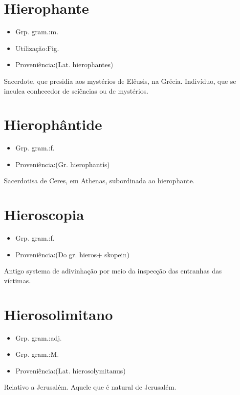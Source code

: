 \documentclass{article}
\begin{document}
\section{Hierophante}
\begin{itemize}
\item {Grp. gram.:m.}
\end{itemize}
\begin{itemize}
\item {Utilização:Fig.}
\end{itemize}
\begin{itemize}
\item {Proveniência:(Lat. \textunderscore hierophantes\textunderscore )}
\end{itemize}
Sacerdote, que presidia aos mystérios de Elêusis, na Grécia.
Indivíduo, que se inculca conhecedor de sciências ou de mystérios.
\section{Hierophântide}
\begin{itemize}
\item {Grp. gram.:f.}
\end{itemize}
\begin{itemize}
\item {Proveniência:(Gr. \textunderscore hierophantís\textunderscore )}
\end{itemize}
Sacerdotisa de Ceres, em Athenas, subordinada ao hierophante.
\section{Hieroscopia}
\begin{itemize}
\item {Grp. gram.:f.}
\end{itemize}
\begin{itemize}
\item {Proveniência:(Do gr. \textunderscore hieros\textunderscore  + \textunderscore skopein\textunderscore )}
\end{itemize}
Antigo systema de adivinhação por meio da inspecção das entranhas das víctimas.
\section{Hierosolimitano}
\begin{itemize}
\item {Grp. gram.:adj.}
\end{itemize}
\begin{itemize}
\item {Grp. gram.:M.}
\end{itemize}
\begin{itemize}
\item {Proveniência:(Lat. \textunderscore hierosolymitanus\textunderscore )}
\end{itemize}
Relativo a Jerusalém.
Aquele que é natural de Jerusalém.
\end{document}
